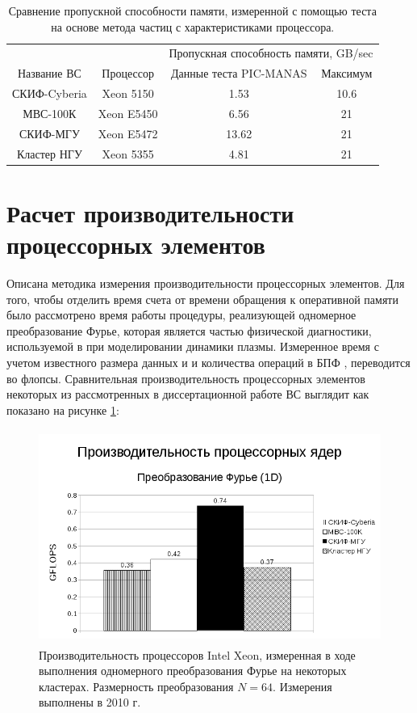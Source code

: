 \begin{table}[ht]
\caption{Сравнение пропускной способности памяти, измеренной с помощью теста на основе метода частиц с характеристиками процессора.}
\label{PIC_vs_PROC_RAM}
\begin{tabular}{|c|c|c|c|}
	\hline
             &            & \multicolumn{2}{|c|}{Пропускная способность памяти, GB/sec} \\ \cline{3-4}  	
Название ВС  & Процессор  & Данные теста PIC-MANAS & Максимум \\ \hline
СКИФ-Cyberia & Xeon 5150  &     1.53           & 10.6     \\ \hline
МВС-100К     & Xeon E5450 &     6.56           & 21       \\ \hline 
СКИФ-МГУ     & Xeon E5472 &     13.62          & 21       \\ \hline     
Кластер НГУ  & Xeon 5355  &     4.81           & 21       \\ \hline
\end{tabular}	
\end{table}

\section{Расчет производительности процессорных элементов}
\label{calc_PE}
Описана методика измерения производительности процессорных элементов.
Для того, чтобы отделить время счета от времени обращения к оперативной памяти было рассмотрено время работы процедуры,
реализующей одномерное преобразование Фурье, которая является частью физической диагностики, используемой в при моделировании динамики плазмы. Измеренное время с учетом известного размера данных и и количества операций в БПФ , переводится во флопсы. Сравнительная производительность процессорных элементов некоторых из рассмотренных в диссертационной работе ВС выглядит как показано на рисунке  \ref{procs_flops}:

\begin{figure}[htb]
	\begin{center}
		\includegraphics[height=7cm,keepaspectratio]{images/processor_FLOPS.png}
	\end{center}
	\caption{Производительность процессоров Intel Xeon, измеренная в ходе выполнения одномерного преобразования Фурье на некоторых кластерах. Размерность преобразования $N=64$. Измерения выполнены в 2010 г.}
	\label{procs_flops}
\end{figure} 


